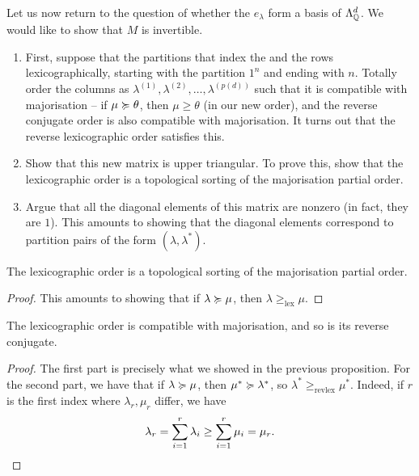 	Let us now return to the question of whether the $e_\lambda$ form a basis of $\Lambda_{\mathbb{Q}}^d$. We would like to show that $M$ is invertible.

	\begin{enumerate}
		\item First, suppose that the partitions that index the and the rows lexicographically, starting with the partition $1^n$ and ending with $n$. Totally order the columns as $\lambda^{(1)},\lambda^{(2)},\ldots,\lambda^{(p(d))}$ such that it is compatible with majorisation -- if $\mu \succcurlyeq \theta$, then $\mu \ge \theta$ (in our new order), and the reverse conjugate order is also compatible with majorisation. It turns out that the reverse lexicographic order satisfies this. 
		\item Show that this new matrix is upper triangular. To prove this, show that the lexicographic order is a topological sorting of the majorisation partial order.
		\item Argue that all the diagonal elements of this matrix are nonzero (in fact, they are $1$). This amounts to showing that the diagonal elements correspond to partition pairs of the form $(\lambda,\lambda^*)$.
	\end{enumerate}

	\begin{prop}
		\label{lem: invertible M 2}
		The lexicographic order is a topological sorting of the majorisation partial order.
	\end{prop}
	\begin{proof}
		This amounts to showing that if $\lambda \succcurlyeq \mu$, then $\lambda \ge_{\text{lex}} \mu$. 
	\end{proof}

	\begin{corollary}
		The lexicographic order is compatible with majorisation, and so is its reverse conjugate.
	\end{corollary}
	\begin{proof}
		The first part is precisely what we showed in the previous proposition. For the second part, we have that if $\lambda \succcurlyeq \mu$, then $\mu^* \succcurlyeq \lambda^*$, so $\lambda^* \ge_{\text{revlex}} \mu^*$. Indeed, if $r$ is the first index where $\lambda_r,\mu_r$ differ, we have
		\[ \lambda_r = \sum_{i=1}^r \lambda_i \ge \sum_{i=1}^r \mu_i = \mu_r. \qedhere \]
	\end{proof}

